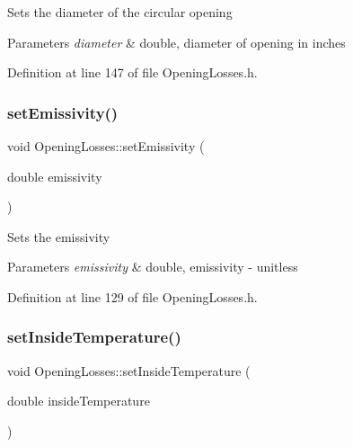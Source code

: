 Sets the diameter of the circular opening 
\begin{DoxyParams}{Parameters}
{\em diameter} & double, diameter of opening in inches \\
\hline
\end{DoxyParams}


Definition at line 147 of file Opening\+Losses.\+h.

\mbox{\label{class_opening_losses_aa63eb1c2ba9057d401f3a7f5dd974afe}} 
\subsubsection{\texorpdfstring{set\+Emissivity()}{setEmissivity()}}
{\footnotesize\ttfamily void Opening\+Losses\+::set\+Emissivity (\begin{DoxyParamCaption}\item[{double}]{emissivity }\end{DoxyParamCaption})\hspace{0.3cm}{\ttfamily [inline]}}

Sets the emissivity 
\begin{DoxyParams}{Parameters}
{\em emissivity} & double, emissivity -\/ unitless \\
\hline
\end{DoxyParams}


Definition at line 129 of file Opening\+Losses.\+h.

\mbox{\label{class_opening_losses_a895dcaa81bbb3dc823ec903480f05262}} 
\subsubsection{\texorpdfstring{set\+Inside\+Temperature()}{setInsideTemperature()}}
{\footnotesize\ttfamily void Opening\+Losses\+::set\+Inside\+Temperature (\begin{DoxyParamCaption}\item[{double}]{inside\+Temperature }\end{DoxyParamCaption})\hspace{0.3cm}{\ttfamily [inline]}}

